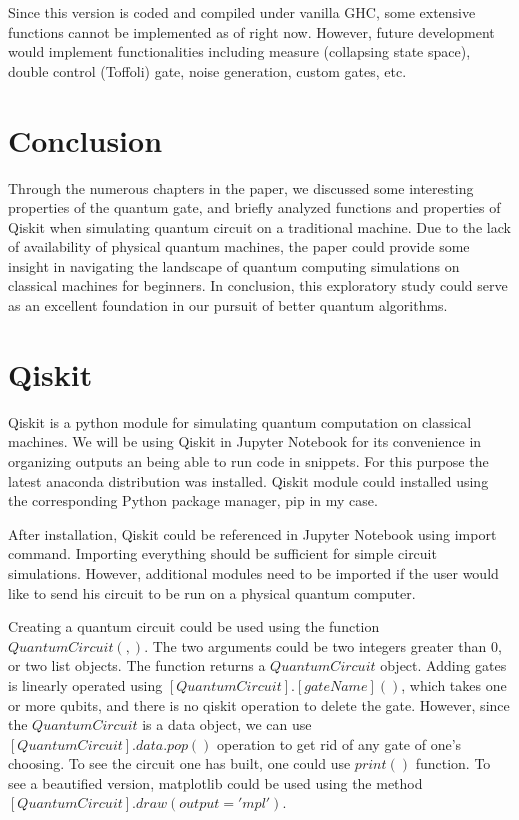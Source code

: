 \documentclass{article}
\begin{document}
Since this version is coded and compiled under vanilla GHC, some extensive functions cannot be implemented as of right now. However, future development would implement functionalities including measure (collapsing state space), double control (Toffoli) gate, noise generation, custom gates, etc.

\section{Conclusion}

Through the numerous chapters in the paper, we discussed some interesting properties of the quantum gate, and briefly analyzed functions and properties of Qiskit when simulating quantum circuit on a traditional machine. Due to the lack of availability of physical quantum machines, the paper could provide some insight in navigating the landscape of quantum computing simulations on classical machines for beginners. In conclusion, this exploratory study could serve as an excellent foundation in our pursuit of better quantum algorithms.

\newpage
\appendix
\appendixpage
\section{Qiskit}

Qiskit is a python module for simulating quantum computation on classical machines. We will be using Qiskit in Jupyter Notebook for its convenience in organizing outputs an being able to run code in snippets. For this purpose the latest anaconda distribution was installed. Qiskit module could installed using the corresponding Python package manager, pip in my case.

After installation, Qiskit could be referenced in Jupyter Notebook using import command. Importing everything should be sufficient for simple circuit simulations. However, additional modules need to be imported if the user would like to send his circuit to be run on a physical quantum computer.

Creating a quantum circuit could be used using the function \newline$QuantumCircuit(,)$. The two arguments could be two integers greater than 0, or two list objects. The function returns a $QuantumCircuit$ object. Adding gates is linearly operated using $[QuantumCircuit].[gateName]()$, which takes one or more qubits, and there is no qiskit operation to delete the gate. However, since the $QuantumCircuit$ is a data object, we can use \newline$[QuantumCircuit].data.pop()$ operation to get rid of any gate of one's choosing. To see the circuit one has built, one could use $print()$ function. To see a beautified version, matplotlib could be used using the method \newline$[QuantumCircuit].draw(output='mpl')$.
\end{document}
